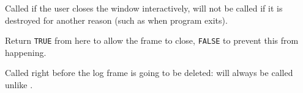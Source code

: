 Called if the user closes the window interactively, will not be
called if it is destroyed for another reason (such as when program
exits).

Return {\tt TRUE} from here to allow the frame to close, {\tt FALSE} to
prevent this from happening.



\label{wxlogwindowonframedelete}


Called right before the log frame is going to be deleted: will
always be called unlike .


